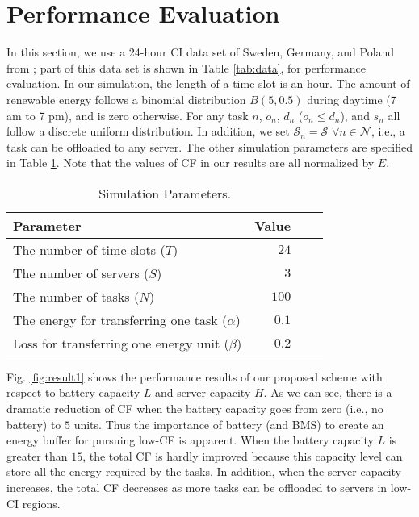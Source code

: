 \documentclass[conference, 10pt, ﬁnal, letterpaper, twocolumn]{IEEEtran}
\begin{document}
\section{Performance Evaluation}

In this section, we use a 24-hour CI data set of Sweden, Germany, and Poland from \cite{ElectricityMaps}; part of this data set is shown in Table \ref{tab:data}, for performance evaluation. In our simulation, the length of a time slot is an hour. The amount of renewable energy follows a binomial distribution $B(5, 0.5)$ \cite{coskun2011estimation} during daytime (7 am to 7 pm), and is zero otherwise. For any task $n$, $o_{n}$, $d_n$ ($o_n \leq d_n$), and $s_n$ all follow a discrete uniform distribution. In addition, we set $\mathcal{S}_n = \mathcal{S}$ $\forall n \in \mathcal{N}$, i.e., a task can be offloaded to any server. The other simulation parameters are specified in Table \ref{tab:parameters}. Note that the values of CF in our results are all normalized by $E$. 

\begin{table}[h]
    \caption{\label{tab:parameters}Simulation Parameters.}
    \footnotesize
    \begin{center}
        \begin{threeparttable}[b]
            \begin{tabular}{*{2}{lr}}
                \toprule
                \midrule
                {\bf Parameter} & {\bf Value}\\
                \midrule
                 The number of time slots ($T$) & $24$ \\
                 The number of servers ($S$) & $3$\\
                 The number of tasks ($N$) & $100$\\
                 The energy for transferring one task ($\alpha$) & $0.1$\\
                 Loss for transferring one energy unit ($\beta$) & $0.2$\\
                \bottomrule
            \end{tabular}
        \end{threeparttable}
    \end{center}
\end{table}



Fig. \ref{fig:result1} shows the performance results of our proposed scheme with respect to battery capacity $L$ and server capacity $H$. As we can see, there is a dramatic reduction of CF when the battery capacity goes from zero (i.e., no battery) to $5$ units. Thus the importance of battery (and BMS) to create an energy buffer for pursuing low-CF is apparent. When the battery capacity $L$ is greater than $15$, the total CF is hardly improved because this capacity level can store all the energy required by the tasks. In addition, when the server capacity increases, the total CF decreases as more tasks can be offloaded to servers in low-CI regions.
\end{document}
